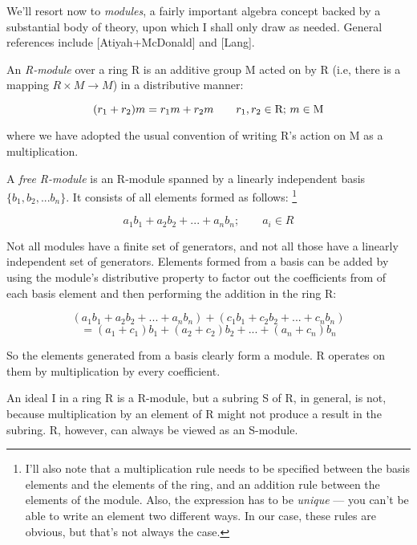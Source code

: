 
We'll resort now to {\it modules}, a fairly important algebra concept
backed by a substantial body of theory, upon which I shall only draw
as needed.  General references include [Atiyah+McDonald] and [Lang].


An {\it R-module} over a ring R is an additive group M acted on by R
(i.e, there is a mapping $R \times M \to M$) in a distributive manner:

$$(r_1 + r_2)m = r_1 m + r_2 m \qquad r_1, r_2 \in {\rm R};\, m \in {\rm M}$$

where we have adopted the usual convention of writing R's action on M
as a multiplication.

\enddefinition


A {\it free R-module} is an R-module spanned by a linearly independent basis
$\{b_1, b_2, ... b_n\}$.  It consists of all elements formed as follows:
\footnote{I'll also note that a multiplication rule needs to be specified
between the basis elements and the elements of the ring, and an
addition rule between the elements of the module.  Also,
the expression has to be {\it unique} --- you can't be
able to write an element two different ways.  In our
case, these rules are obvious, but that's not always the case.}

	$$ a_1 b_1 + a_2 b_2 + ... + a_n b_n; \qquad a_i \in R $$


\enddefinition

Not all modules have a finite set of generators, and not all those
have a linearly independent set of generators.  Elements formed from a
basis can be added by using the module's distributive property to
factor out the coefficients from of each basis element and then
performing the addition in the ring R:

$$ (a_1 b_1 + a_2 b_2 + ... + a_n b_n) + (c_1 b_1 + c_2 b_2 + ... + c_n b_n) $$
$$  = (a_1 + c_1) b_1 + (a_2 + c_2) b_2 + ... + (a_n + c_n) b_n $$

So the elements generated from a basis clearly form a module.  R operates
on them by multiplication by every coefficient.

\example \quad
\label{sample modules}

An ideal I in a ring R is a R-module, but a subring S of R, in
general, is not, because multiplication by an element of R might not
produce a result in the subring.  R, however, can always be viewed as
an S-module.

